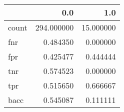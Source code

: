 \begin{tabular}{lrr}
\toprule
{} &         0.0 &        1.0 \\
\midrule
count &  294.000000 &  15.000000 \\
fnr   &    0.484350 &   0.000000 \\
fpr   &    0.425477 &   0.444444 \\
tnr   &    0.574523 &   0.000000 \\
tpr   &    0.515650 &   0.666667 \\
bacc  &    0.545087 &   0.111111 \\
\bottomrule
\end{tabular}
